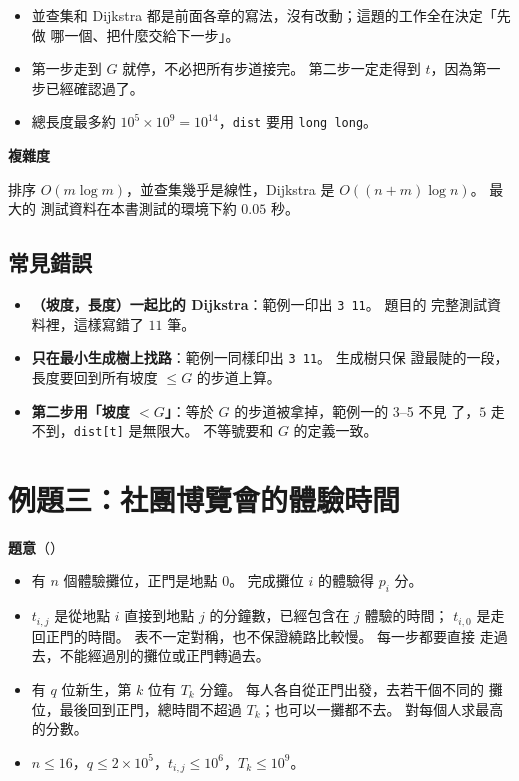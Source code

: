 \begin{itemize}
\item 並查集和 Dijkstra 都是前面各章的寫法，沒有改動；這題的工作全在決定「先做
哪一個、把什麼交給下一步」。
\item 第一步走到 $G$ 就停，不必把所有步道接完。 第二步一定走得到 $t$，因為第一
步已經確認過了。
\item 總長度最多約 $10^5 \times 10^9 = 10^{14}$，\texttt{dist} 要用
\texttt{long long}。
\end{itemize}

\textbf{複雜度}

排序 $O(m \log m)$，並查集幾乎是線性，Dijkstra 是 $O((n + m) \log n)$。 最大的
測試資料在本書測試的環境下約 $0.05$ 秒。

\subsection{常見錯誤}

\begin{itemize}
\item \textbf{（坡度，長度）一起比的 Dijkstra}：範例一印出 \texttt{3 11}。 題目的
完整測試資料裡，這樣寫錯了 $11$ 筆。
\item \textbf{只在最小生成樹上找路}：範例一同樣印出 \texttt{3 11}。 生成樹只保
證最陡的一段，長度要回到所有坡度 $\le G$ 的步道上算。
\item \textbf{第二步用「坡度 $< G$」}：等於 $G$ 的步道被拿掉，範例一的 3--5 不見
了，$5$ 走不到，\texttt{dist[t]} 是無限大。 不等號要和 $G$ 的定義一致。
\end{itemize}

\section{例題三：社團博覽會的體驗時間}
\label{sec:cap-expo}

\textbf{題意}（）

\begin{itemize}
\item 有 $n$ 個體驗攤位，正門是地點 $0$。 完成攤位 $i$ 的體驗得 $p_i$ 分。
\item $t_{i,j}$ 是從地點 $i$ 直接到地點 $j$ 的分鐘數，已經包含在 $j$ 體驗的時間；
$t_{i,0}$ 是走回正門的時間。 表不一定對稱，也不保證繞路比較慢。 每一步都要直接
走過去，不能經過別的攤位或正門轉過去。
\item 有 $q$ 位新生，第 $k$ 位有 $T_k$ 分鐘。 每人各自從正門出發，去若干個不同的
攤位，最後回到正門，總時間不超過 $T_k$；也可以一攤都不去。 對每個人求最高的分數。
\item $n \le 16$，$q \le 2 \times 10^5$，$t_{i,j} \le 10^6$，$T_k \le 10^9$。
\end{itemize}

